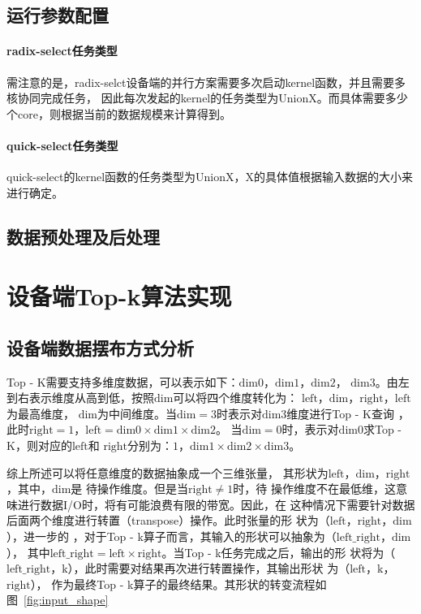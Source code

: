     \subsection{运行参数配置}

        \paragraph{radix-select任务类型}
            需注意的是，radix-selct设备端的并行方案需要多次启动kernel函数，并且需要多核协同完成任务，
            因此每次发起的kernel的任务类型为UnionX。而具体需要多少个core，则根据当前的数据规模来计算得到。
            


        \paragraph{quick-select任务类型}
            quick-select的kernel函数的任务类型为UnionX，X的具体值根据输入数据的大小来进行确定。

    \subsection{数据预处理及后处理}



\section{设备端Top-k算法实现}
    \subsection{设备端数据摆布方式分析}


Top - K需要支持多维度数据，可以表示如下：\(\text{dim0}\)，\(\text{dim1}\)，\(\text{dim2}\)，
\(\text{dim3}\)。由左到右表示维度从高到低，按照\(\text{dim}\)可以将四个维度转化为：
\(\text{left}\)，\(\text{dim}\)，\(\text{right}\)，\(\text{left}\)为最高维度，
\(\text{dim}\)为中间维度。当\(\text{dim} = 3\)时表示对\(\text{dim3}\)维度进行Top - K查询
，此时\(\text{right} = 1\)，\(\text{left} = \text{dim0}×\text{dim1}×\text{dim2}\)。
当\(\text{dim} = 0\)时，表示对\(\text{dim0}\)求Top - K，则对应的\(\text{left}\)和
\(\text{right}\)分别为：\(1\)，\(\text{dim1}×\text{dim2}×\text{dim3}\)。

综上所述可以将任意维度的数据抽象成一个三维张量，
其形状为\(\text{left}\)，\(\text{dim}\)，\(\text{right}\)，其中，\(\text{dim}\)是
待操作维度。但是当\(\text{right}≠1\)时，待
操作维度不在最低维，这意味进行数据I/O时，将有可能浪费有限的带宽。因此，在
这种情况下需要针对数据后面两个维度进行转置（transpose）操作。此时张量的形
状为（\(\text{left}\)，\(\text{right}\)，\(\text{dim}\)），进一步的
，对于Top - k算子而言，其输入的形状可以抽象为（\(\text{left\_right}\)，\(\text{dim}\)），
其中\(\text{left\_right}=\text{left}×\text{right}\)。当Top - k任务完成之后，输出的形
状将为（\(\text{left\_right}\)，\(\text{k}\)），此时需要对结果再次进行转置操作，其输出形状
为（\(\text{left}\)，\(\text{k}\)，\(\text{right}\)），
作为最终Top - k算子的最终结果。其形状的转变流程如图~\ref{fig:input_shape}

